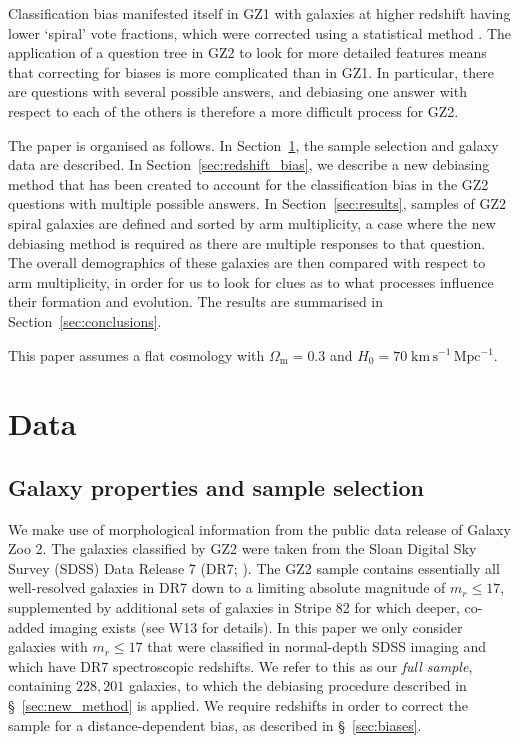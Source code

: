 \documentclass[useAMS,usenatbib]{mn2e}
\begin{document}
Classification bias manifested itself in GZ1 with galaxies at higher redshift having lower `spiral' vote fractions, which were corrected using a statistical method \citep{Bamford_09}. The application of a question tree in GZ2 to look for more detailed features means that correcting for biases is more complicated than in GZ1. In particular, there are questions with several possible answers, and debiasing one answer with respect to each of the others is therefore a more difficult process for GZ2.

The paper is organised as follows. In Section~\ref{sec:data}, the sample selection and galaxy data are described. In Section~\ref{sec:redshift_bias}, we describe a new debiasing method that has been created to account for the classification bias in the GZ2 questions with multiple possible answers. In Section~\ref{sec:results}, samples of GZ2 spiral galaxies are defined and sorted by arm multiplicity, a case where the new debiasing method is required as there are multiple responses to that question. The overall demographics of these galaxies are then compared with respect to arm multiplicity, in order for us to look for clues as to what processes influence their formation and evolution. The results are summarised in Section~\ref{sec:conclusions}.

This paper assumes a flat cosmology with $\Omega_\mathrm{m} = 0.3$ and $H_0 = 70\;\mathrm{km\,s^{-1}\,Mpc^{-1}}$.
\section{Data}
\label{sec:data}
\subsection{Galaxy properties and sample selection}
\label{sec:sample}

We make use of morphological information from the public data release of Galaxy Zoo 2. The galaxies classified by GZ2 were taken from the Sloan Digital Sky Survey (SDSS) Data Release 7 (DR7; \citet{Abazijian_09}). The GZ2 sample contains essentially all well-resolved galaxies in DR7 down to a limiting absolute magnitude of $m_r \leq 17$, supplemented by additional sets of galaxies in Stripe 82 for which deeper, co-added imaging exists (see W13 for details).  In this paper we only consider galaxies with $m_r \leq 17$ that were classified in normal-depth SDSS imaging and which have DR7 spectroscopic redshifts. We refer to this as our \textit{full sample}, containing $228,201$ galaxies, to which the debiasing procedure described in \S~\ref{sec:new_method} is applied. We require redshifts in order to correct the sample for a distance-dependent bias, as described in \S~\ref{sec:biases}.
\end{document}
